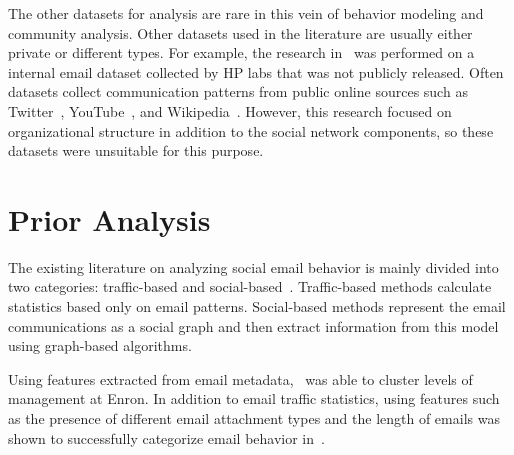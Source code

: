\documentclass[12pt]{report}
\begin{document}
The other datasets for analysis are rare in this vein of behavior modeling and community analysis.
Other datasets used in the literature are usually either private or different types.
For example, the research in~\cite{tyler_email_2003} was performed on a internal email dataset collected by HP labs that was not publicly released.
Often datasets collect communication patterns from public online sources such as Twitter~\cite{Zafarani+Liu:2009}, YouTube~\cite{mislove-2007-socialnetworks},  and Wikipedia~\cite{leskovec2010predicting}.
However, this research focused on organizational structure in addition to the social network components, so these datasets were unsuitable for this purpose.

\section{Prior Analysis}
The existing literature on analyzing social email behavior is mainly divided into two categories: traffic-based and social-based~\cite{tang_email_2013}.
Traffic-based methods calculate statistics based only on email patterns.
Social-based methods represent the email communications as a social graph and then extract information from this model using graph-based algorithms.

Using features extracted from email metadata,~\cite{yelupula_social_2008} was able to cluster levels of management at Enron.
In addition to email traffic statistics, using features such as the presence of different email attachment types and the length of emails was shown to successfully categorize email behavior in~\cite{martin_analyzing_2005}.
\end{document}

